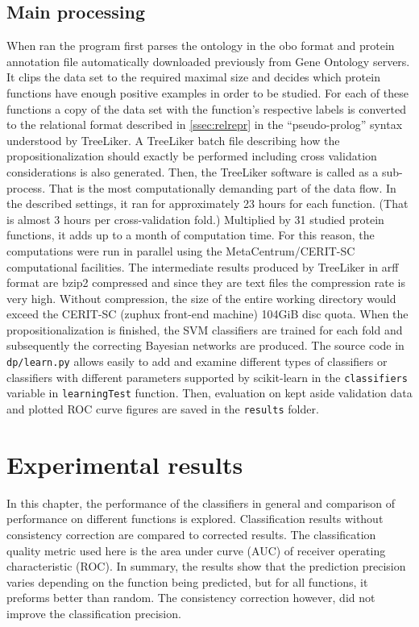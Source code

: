 \documentclass[11pt,twoside,a4paper]{book}
\begin{document}
\section{Main processing} When ran the program first parses the ontology in the obo format and protein annotation file
automatically downloaded previously from Gene Ontology servers.
It clips the data set to the required maximal size and decides which
protein functions have enough positive examples in order to be studied.
For each of these functions a copy of the data set 
with the function's respective labels is
converted to the 
relational format described in \ref{ssec:relrepr} in the ``pseudo-prolog''
syntax understood by TreeLiker.
A TreeLiker batch file describing how the propositionalization
should exactly be performed including cross validation considerations
is also generated.
Then, the TreeLiker software is called as a sub-process.
That is the most computationally demanding part of the data flow.
In the described settings, it ran for approximately 23 hours for each function.
(That is almost 3 hours per cross-validation fold.)
Multiplied by 31 studied protein functions, it adds up to a month of computation time.
For this reason, the computations were run in parallel 
using the MetaCentrum/CERIT-SC computational facilities.
The intermediate results produced by TreeLiker in arff format are bzip2 compressed
and since they are text files the compression rate is very high. 
Without compression, the size of the entire working directory
would exceed the CERIT-SC (zuphux front-end machine) 104GiB disc quota.
When the propositionalization is finished,
the SVM classifiers are trained for each fold
and subsequently the correcting Bayesian networks are produced.
The source code in \texttt{dp/learn.py}
allows easily to add and examine different types of classifiers 
or classifiers with different parameters supported 
by scikit-learn in the \texttt{classifiers} variable
in \texttt{learningTest} function.
Then, evaluation on kept aside validation data 
and plotted ROC curve figures are saved
in the \texttt{results} folder.


\chapter{Experimental results}
\label{ch:results}

In this chapter, 
the performance of the classifiers in 
general and comparison of performance on different functions
is explored. 
Classification results without consistency correction are compared to
corrected results.
The classification quality metric used here is the area under curve (AUC)
of receiver operating characteristic (ROC).
In summary, the results show that
the prediction precision varies depending on the function being predicted,
but for all functions, it preforms better than random. 
The consistency correction however, did not improve the classification precision.
\end{document}
